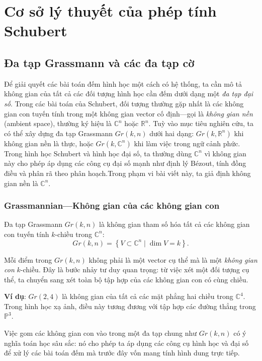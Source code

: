 \section{Cơ sở lý thuyết của phép tính Schubert}

\subsection{Đa tạp Grassmann và các đa tạp cờ}

Để giải quyết các bài toán đếm hình học một cách có hệ thống, ta cần mô tả không gian của tất cả các đối tượng hình học cần đếm dưới dạng một \textit{đa tạp đại số}. Trong các bài toán của Schubert, đối tượng thường gặp nhất là các không gian con tuyến tính trong một không gian vector cố định—gọi là \textit{không gian nền} (ambient space), thường ký hiệu là $\mathbb{C}^n$ hoặc $\mathbb{R}^n$. Tuỳ vào mục tiêu nghiên cứu, ta có thể xây dựng đa tạp Grassmann $Gr(k,n)$ dưới hai dạng: $Gr(k, \mathbb{R}^n)$ khi không gian nền là thực, hoặc $Gr(k, \mathbb{C}^n)$ khi làm việc trong ngữ cảnh phức. Trong hình học Schubert và hình học đại số, ta thường dùng $\mathbb{C}^n$ vì không gian này cho phép áp dụng các công cụ đại số mạnh như định lý Bézout, tính đồng điều và phân rã theo phân hoạch.Trong phạm vi bài viết này, ta giả định không gian nền là $\mathbb{C}^n$.

\subsubsection{\textbf{Grassmannian---Không gian của các không gian con}}
Đa tạp Grassmann $Gr(k,n)$ là không gian tham số hóa tất cả các không gian con tuyến tính $k$-chiều trong $\mathbb{C}^n$:
\[ Gr(k,n) = \left\{ V \subset \mathbb{C}^n \mid \dim V = k \right\}. \]

Mỗi điểm trong $Gr(k,n)$ không phải là một vector cụ thể mà là một \textit{không gian con} $k$-chiều. Đây là bước nhảy tư duy quan trọng: từ việc xét một đối tượng cụ thể, ta chuyển sang xét toàn bộ tập hợp của các không gian con có cùng chiều.

\textbf{Ví dụ}: $Gr(2,4)$ là không gian của tất cả các mặt phẳng hai chiều trong $\mathbb{C}^4$. Trong hình học xạ ảnh, điều này tương đương với tập hợp các đường thẳng trong $\mathbb{P}^3$.

Việc gom các không gian con vào trong một đa tạp chung như $Gr(k,n)$ có ý nghĩa toán học sâu sắc: nó cho phép ta áp dụng các công cụ hình học và đại số để xử lý các bài toán đếm mà trước đây vốn mang tính hình dung trực tiếp.

